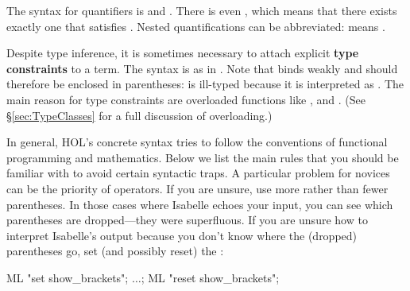 The syntax for quantifiers is
 and
.  There is
even , which
means that there exists exactly one  that satisfies .  Nested
quantifications can be abbreviated:  means
.

Despite type inference, it is sometimes necessary to attach explicit
\textbf{type constraints} to a term.  The syntax is
 as in . Note that
 binds weakly and should therefore be enclosed
in parentheses:  is ill-typed because it is interpreted as
. The main reason for type constraints are overloaded
functions like \isa{+}, \isa{*} and \isa{<}. (See \S\ref{sec:TypeClasses} for
a full discussion of overloading.)

\begin{warn}
In general, HOL's concrete syntax tries to follow the conventions of
functional programming and mathematics. Below we list the main rules that you
should be familiar with to avoid certain syntactic traps. A particular
problem for novices can be the priority of operators. If you are unsure, use
more rather than fewer parentheses. In those cases where Isabelle echoes your
input, you can see which parentheses are dropped---they were superfluous. If
you are unsure how to interpret Isabelle's output because you don't know
where the (dropped) parentheses go, set (and possibly reset) the 
:
\begin{ttbox}
ML "set show_brackets"; \(\dots\); ML "reset show_brackets";
\end{ttbox}
\end{warn}

